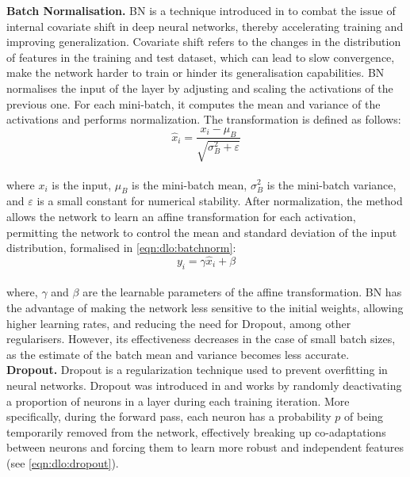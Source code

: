 \noindent \textbf{Batch Normalisation.} \ac{BN} is a technique introduced in
\cite{DBLP:conf/icml/IoffeS15} to combat the issue of internal covariate shift
in deep neural networks, thereby accelerating training and improving
generalization. Covariate shift refers to the changes in the distribution of
features in the training and test dataset, which can lead to slow convergence,
make the network harder to train or hinder its generalisation capabilities.
\ac{BN} normalises the input of the layer by adjusting and scaling the
activations of the previous one. For each mini-batch, it computes the mean and
variance of the activations and performs normalization. The transformation is
defined as follows:\\

\begin{equation}
  \label{eqn:dlo:batchnorm}
  \hat{x}_{i} = \frac{x_{i} - \mu_{B}}{\sqrt{\sigma_{B}^{2} + \varepsilon}}
\end{equation}\\

\noindent where $x_{i}$ is the input, $\mu_{B}$ is the mini-batch mean,
$\sigma_{B}^{2}$ is the mini-batch variance, and $\varepsilon$ is a small
constant for numerical stability. After normalization, the method allows the
network to learn an affine transformation for each activation, permitting the
network to control the mean and standard deviation of the input distribution,
formalised in \cref{eqn:dlo:batchnorm}:\\

\begin{equation}
  \label{eqn:dlo:batchnorm_affine}
  y_{i} = \gamma \hat{x}_{i} + \beta
\end{equation}\\

\noindent where, $\gamma$ and $\beta$ are the learnable parameters of the affine
transformation. \ac{BN} has the advantage of making the network less sensitive
to the initial weights, allowing higher learning rates, and reducing the need
for Dropout, among other regularisers. However, its effectiveness decreases in
the case of small batch sizes, as the estimate of the batch mean and variance
becomes less accurate.\\

\noindent \textbf{Dropout.} Dropout is a regularization technique used to
prevent overfitting in neural networks. Dropout was introduced in
\cite{DBLP:journals/jmlr/SrivastavaHKSS14} and works by randomly deactivating a
proportion of neurons in a layer during each training iteration. More
specifically, during the forward pass, each neuron has a probability $p$ of
being temporarily removed from the network, effectively breaking up
co-adaptations between neurons and forcing them to learn more robust and
independent features (see \cref{eqn:dlo:dropout}).\\


